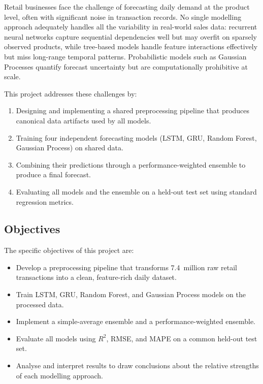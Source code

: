 \documentclass[12pt, a4paper]{article}
\begin{document}
Retail businesses face the challenge of forecasting daily demand at the product level, often
with significant noise in transaction records. No single modelling approach adequately
handles all the variability in real-world sales data: recurrent neural networks capture
sequential dependencies well but may overfit on sparsely observed products, while tree-based
models handle feature interactions effectively but miss long-range temporal patterns.
Probabilistic models such as Gaussian Processes quantify forecast uncertainty but are
computationally prohibitive at scale.

This project addresses these challenges by:
\begin{enumerate}[leftmargin=*, label=(\roman*)]
    \item Designing and implementing a shared preprocessing pipeline that produces canonical
          data artifacts used by all models.
    \item Training four independent forecasting models (LSTM, GRU, Random Forest, Gaussian
          Process) on shared data.
    \item Combining their predictions through a performance-weighted ensemble to produce a
          final forecast.
    \item Evaluating all models and the ensemble on a held-out test set using standard
          regression metrics.
\end{enumerate}

\subsection{Objectives}
\label{subsec:objectives}

The specific objectives of this project are:
\begin{itemize}[leftmargin=*]
    \item Develop a preprocessing pipeline that transforms 7.4~million raw retail
          transactions into a clean, feature-rich daily dataset.
    \item Train LSTM, GRU, Random Forest, and Gaussian Process models on the processed data.
    \item Implement a simple-average ensemble and a performance-weighted ensemble.
    \item Evaluate all models using $R^{2}$, RMSE, and MAPE on a common held-out test set.
    \item Analyse and interpret results to draw conclusions about the relative strengths of
          each modelling approach.
\end{itemize}
\end{document}
